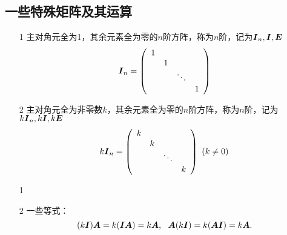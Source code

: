 \subsection{一些特殊矩阵及其运算}

% 
\begin{dingyi}[单位矩阵与数量矩阵]
  \begin{itemize}
  \item[1] 主对角元全为1，其余元素全为零的$n$阶方阵，称为$n$阶，记为$\boldsymbol{I}_n, \boldsymbol{I}, \boldsymbol{E}$
    $$
    \boldsymbol{I}_n = \left(
      \begin{array}{cccc}
        1 & & &\\
          & 1 & & \\
          & & \ddots & \\
          & & & 1
      \end{array}
    \right)
    $$ 
  \item[2] 主对角元全为非零数$k$，其余元素全为零的$n$阶方阵，称为$n$阶，记为$k\boldsymbol{I}_n, k\boldsymbol{I}, k\boldsymbol{E}$
    $$
    k\boldsymbol{I}_n = \left(
      \begin{array}{cccc}
        k & & &\\
          & k & & \\
          & & \ddots & \\
          & & & k
      \end{array}
    \right)~(k\ne 0)
    $$
  \end{itemize}
\end{dingyi}
% 
\begin{zhu}
  \begin{itemize}
  \item[1] 
  \item[2] 一些等式：
    $$
    (k\boldsymbol{I}) \boldsymbol{A} = k(\boldsymbol{I}\boldsymbol{A}) = k\boldsymbol{A}, ~~
    \boldsymbol{A}(k\boldsymbol{I}) = k(\boldsymbol{A}\boldsymbol{I}) = k\boldsymbol{A}.
    $$
  \end{itemize}
\end{zhu}

